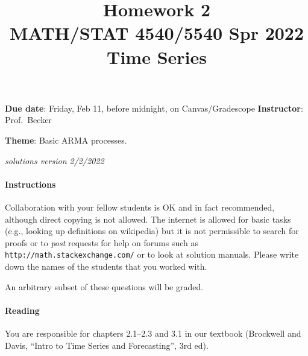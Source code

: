 \documentclass[10pt, letterpaper]{scrartcl}
\title{Homework 2 \solTitle{Selected Solutions} \\MATH/STAT 4540/5540 Spr 2022 Time Series}
\date{}
\newenvironment{instructions}{}{}
\newenvironment{SolnComment}{}{}
\newcommand{\<}{\langle}  %
\renewcommand{\>}{\rangle}%
\begin{document}
\maketitle
\vspace{-6em}
\textbf{\sffamily Due date}: Friday, Feb 11, before midnight, on Canvas/Gradescope
\hfill \textbf{\sffamily Instructor}: Prof.\ Becker

\textbf{\sffamily Theme}: Basic ARMA processes.

\begin{SolnComment}
    \hfill {\em \small    solutions version 2/2/2022}
\end{SolnComment}

\begin{instructions} %
\paragraph{Instructions} 
Collaboration with your fellow students is OK and in fact recommended, although direct copying is not allowed. The internet is allowed for basic tasks (e.g., looking up definitions on wikipedia) but it is not permissible to search for proofs or to \emph{post} requests for help on forums such as \texttt{http://math.stackexchange.com/} or to look at solution manuals. Please write down the names of the students that you worked with.

An arbitrary subset of these questions will be graded.
\vspace{-1em}
\paragraph{Reading} 
You are responsible for chapters 2.1--2.3 and 3.1 in our textbook (Brockwell and Davis, ``Intro to Time Series and Forecasting'', 3rd ed).
\end{instructions}
\end{document}
